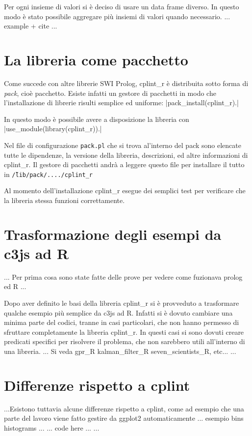 \documentclass[10pt,titlepage,twoside,a4paper]{report}
\begin{document}
Per ogni insieme di valori si è deciso di usare un data frame diverso. In 
questo modo è stato possibile aggregare più insiemi di valori quando 
necessario. ... example + cite ...


\section{La libreria come pacchetto}
Come succede con altre librerie SWI Prolog, cplint\_r è distribuita sotto 
forma di \emph{pack}, cioè pacchetto. Esiste infatti un gestore di pacchetti 
in modo che l'installazione di librerie risulti semplice ed uniforme: 
|pack_install(cplint_r).|

In questo modo è possibile avere a disposizione la libreria con 
|use_module(library(cplint_r)).|

Nel file di configurazione \texttt{pack.pl} che si trova al'interno del pack 
sono elencate tutte le dipendenze, la versione della libreria, descrizioni, 
ed altre informazioni di cplint\_r. Il gestore di pacchetti andrà a leggere 
questo file per installare il tutto in \texttt{\~/lib/pack/..../cplint\_r}

Al momento dell'installazione cplint\_r esegue dei semplici 
test per verificare che la libreria stessa funzioni correttamente.


\section{Trasformazione degli esempi da c3js ad R} \label{sec:trasformazione-
degli-esempi-da-c3js-ad-r}
... Per prima cosa sono state fatte delle prove per vedere come fuzionava 
prolog ed R ...

Dopo aver definito le basi della libreria cplint\_r si è provveduto a 
trasformare qualche esempio più semplice da c3js ad R. Infatti si è 
dovuto cambiare una minima parte del codici, tranne in casi particolari, che 
non hanno permesso di sfruttare completamente la 
libreria cplint\_r. In questi casi si sono dovuti creare predicati specifici 
per risolvere il problema, che non sarebbero utili all'interno di una 
libreria. ... Si veda gpr\_R kalman\_filter\_R seven\_scientists\_R, etc... 
...

\section{Differenze rispetto a cplint}
...Esistono tuttavia alcune differenze rispetto a cplint, come ad esempio che 
una parte del lavoro viene fatto gestire da ggplot2 automaticamente ... esempio 
bins histograms ... ... code here ...
...
\end{document}
